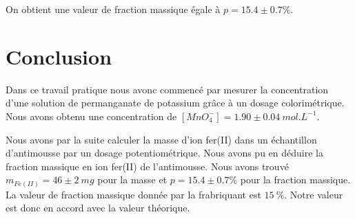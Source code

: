 \documentclass[12pt]{article}
\begin{document}
On obtient une valeur de fraction massique égale à $p=15.4 \pm 0.7 \%$.

\section*{Conclusion}
Dans ce travail pratique nous avonc commencé par mesurer la concentration d'une solution de permanganate de potassium grâce à un dosage colorimétrique.
Nous avons obtenu une concentration de $[MnO_4^-]=1.90 \pm 0.04 \ mol.L^{-1}$.

Nous avons par la suite calculer la masse d'ion fer(II) dans un échantillon d'antimousse par un dosage potentiométrique.
Nous avons pu en déduire la fraction massique en ion fer(II) de l'antimousse.
Nous avons trouvé $m_{Fe(II)}= 46 \pm 2 \ mg$ pour la masse et $p=15.4 \pm 0.7 \%$ pour la fraction massique.
La valeur de fraction massique donnée par la frabriquant est $15 \ \%$. 
Notre valeur est donc en accord avec la valeur théorique.
\end{document}
